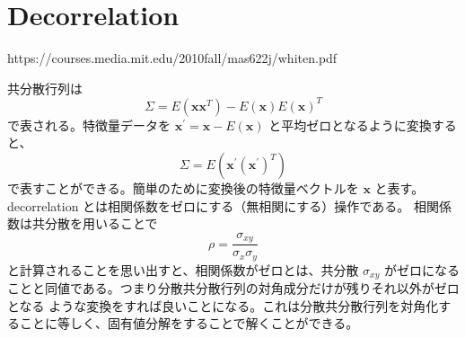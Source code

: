 \documentclass[10pt, a4paper]{ltjsarticle}
\begin{document}
\section{Decorrelation}

https://courses.media.mit.edu/2010fall/mas622j/whiten.pdf

共分散行列は
\begin{equation}
  \Sigma = E(\bm{x}\bm{x}^T) - E(\bm{x})E(\bm{x})^T
\end{equation}
で表される。特徴量データを $\bm{x}^\prime = \bm{x} - E(\bm{x})$ と平均ゼロとなるように変換すると、
\begin{equation}
  \Sigma = E(\bm{x}^\prime(\bm{x}^\prime)^T)
\end{equation}
で表すことができる。簡単のために変換後の特徴量ベクトルを $\bm{x}$ と表す。decorrelation とは相関係数をゼロにする（無相関にする）操作である。
相関係数は共分散を用いることで
\begin{equation}
  \rho = \frac{\sigma_{xy}}{\sigma_x\sigma_y}
\end{equation}
と計算されることを思い出すと、相関係数がゼロとは、共分散 $\sigma_{xy}$ がゼロになることと同値である。つまり分散共分散行列の対角成分だけが残りそれ以外がゼロとなる
ような変換をすれば良いことになる。これは分散共分散行列を対角化することに等しく、固有値分解をすることで解くことができる。
\end{document}
